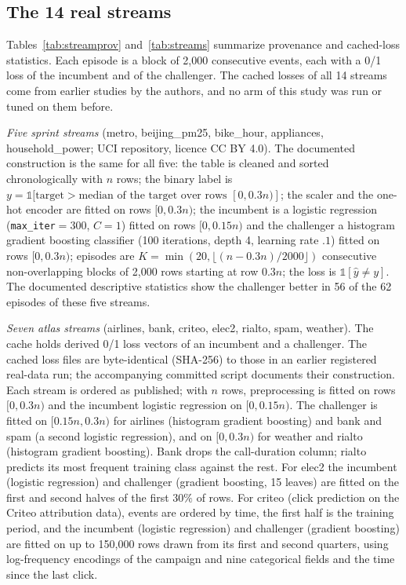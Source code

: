 \documentclass[10pt]{article}
\theoremstyle{plain}
\theoremstyle{definition}
\newcommand{\one}{\mathds{1}}
\begin{document}
{\scriptsize

}

\subsection{The 14 real streams}
Tables~\ref{tab:streamprov} and~\ref{tab:streams} summarize provenance and cached-loss statistics. Each episode is a block of 2{,}000 consecutive events, each with a 0/1 loss of the incumbent and of the challenger. The cached losses of all 14 streams come from earlier studies by the authors, and no arm of this study was run or tuned on them before.

\emph{Five sprint streams} (metro, beijing\_pm25, bike\_hour, appliances, household\_power; UCI repository, licence CC BY 4.0). The documented construction is the same for all five: the table is cleaned and sorted chronologically with $n$ rows; the binary label is $y=\one[\text{target}>\text{median of the target over rows }[0,0.3n)]$; the scaler and the one-hot encoder are fitted on rows $[0,0.3n)$; the incumbent is a logistic regression (\texttt{max\_iter}$=300$, $C=1$) fitted on rows $[0,0.15n)$ and the challenger a histogram gradient boosting classifier (100 iterations, depth 4, learning rate $.1$) fitted on rows $[0,0.3n)$; episodes are $K=\min(20,\lfloor(n-0.3n)/2000\rfloor)$ consecutive non-overlapping blocks of 2{,}000 rows starting at row $0.3n$; the loss is $\one[\hat y\ne y]$. The documented descriptive statistics show the challenger better in 56 of the 62 episodes of these five streams.

\emph{Seven atlas streams} (airlines, bank, criteo, elec2, rialto, spam, weather). The cache holds derived 0/1 loss vectors of an incumbent and a challenger. The cached loss files are byte-identical (SHA-256) to those in an earlier registered real-data run; the accompanying committed script documents their construction. Each stream is ordered as published; with $n$ rows, preprocessing is fitted on rows $[0,0.3n)$ and the incumbent logistic regression on $[0,0.15n)$. The challenger is fitted on $[0.15n,0.3n)$ for airlines (histogram gradient boosting) and bank and spam (a second logistic regression), and on $[0,0.3n)$ for weather and rialto (histogram gradient boosting). Bank drops the call-duration column; rialto predicts its most frequent training class against the rest. For elec2 the incumbent (logistic regression) and challenger (gradient boosting, 15 leaves) are fitted on the first and second halves of the first $30\%$ of rows. For criteo (click prediction on the Criteo attribution data), events are ordered by time, the first half is the training period, and the incumbent (logistic regression) and challenger (gradient boosting) are fitted on up to 150{,}000 rows drawn from its first and second quarters, using log-frequency encodings of the campaign and nine categorical fields and the time since the last click.
\end{document}
